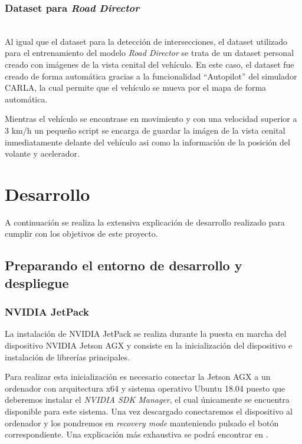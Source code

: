 \subsubsection{Dataset para \textit{Road Director}}\mbox{}\\ \label{sec:datasetRD}
Al igual que el dataset para la detección de intersecciones, el dataset utilizado para el entrenamiento del modelo \textit{Road Director} se trata de un dataset personal creado con imágenes de la vista cenital del vehículo.
En este caso, el dataset fue creado de forma automática gracias a la funcionalidad ``Autopilot'' del simulador CARLA, la cual permite que el vehículo se mueva por el mapa de forma automática.

Mientras el vehículo se encontrase en movimiento y con una velocidad superior a 3 km/h un pequeño script se encarga de guardar la imágen de la vista cenital inmediatamente delante del vehículo asi como la información de la posición del volante y acelerador.








\clearpage
\section{Desarrollo} \label{sec:desarrollo}
A continuación se realiza la extensiva explicación de desarrollo realizado para cumplir con los objetivos de este proyecto.

\subsection{Preparando el entorno de desarrollo y despliegue}
\subsubsection{NVIDIA JetPack}
La instalación de NVIDIA JetPack se realiza durante la puesta en marcha del dispositivo NVIDIA Jetson AGX y consiste en la inicialización del dispositivo e instalación de librerías principales.

Para realizar esta inicialización es necesario conectar la Jetson AGX a un ordenador con arquitectura x64 y sistema operativo Ubuntu 18.04 puesto que deberemos instalar el \textit{NVIDIA SDK Manager}, el cual únicamente se encuentra disponible para este sistema. Una vez descargado conectaremos el dispositivo al ordenador y los pondremos en \textit{recovery mode} manteniendo pulsado el botón correspondiente. Una explicación más exhaustiva se podrá encontrar en \cite{manualJetson}.


